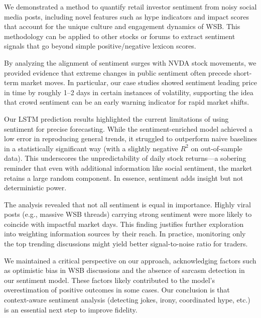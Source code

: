 \documentclass[conference]{IEEEtran}
\begin{document}
We demonstrated a method to quantify retail investor sentiment from noisy social media posts, including novel features such as hype indicators and impact scores that account for the unique culture and engagement dynamics of WSB. This methodology can be applied to other stocks or forums to extract sentiment signals that go beyond simple positive/negative lexicon scores.

By analyzing the alignment of sentiment surges with NVDA stock movements, we provided evidence that extreme changes in public sentiment often precede short-term market moves. In particular, our case studies showed sentiment leading price in time by roughly 1–2 days in certain instances of volatility, supporting the idea that crowd sentiment can be an early warning indicator for rapid market shifts.

Our LSTM prediction results highlighted the current limitations of using sentiment for precise forecasting. While the sentiment-enriched model achieved a low error in reproducing general trends, it struggled to outperform naive baselines in a statistically significant way (with a slightly negative $R^2$ on out-of-sample data). This underscores the unpredictability of daily stock returns—a sobering reminder that even with additional information like social sentiment, the market retains a large random component. In essence, sentiment adds insight but not deterministic power.

The analysis revealed that not all sentiment is equal in importance. Highly viral posts (e.g., massive WSB threads) carrying strong sentiment were more likely to coincide with impactful market days. This finding justifies further exploration into weighting information sources by their reach. In practice, monitoring only the top trending discussions might yield better signal-to-noise ratio for traders.

We maintained a critical perspective on our approach, acknowledging factors such as optimistic bias in WSB discussions and the absence of sarcasm detection in our sentiment model. These factors likely contributed to the model’s overestimation of positive outcomes in some cases. Our conclusion is that context-aware sentiment analysis (detecting jokes, irony, coordinated hype, etc.) is an essential next step to improve fidelity.
\end{document}
